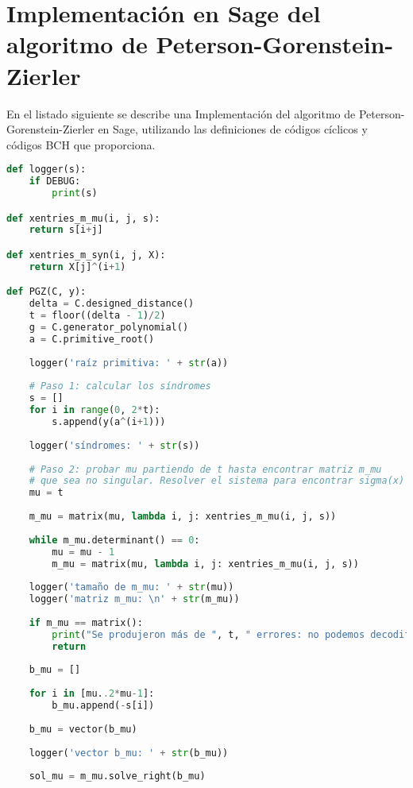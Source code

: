 \chapter[Implementación en Sage del algoritmo PGZ]{Implementación en Sage del algoritmo de Peterson-Gorenstein-Zierler}

En el listado siguiente se describe una Implementación del algoritmo de Peterson-Gorenstein-Zierler en Sage, utilizando las definiciones de códigos cíclicos y códigos BCH que proporciona.

\begin{lstlisting}[language=Python, caption=Implementación del algoritmo de Peterson-Gorenstein-Zierler en Sage]
  def logger(s):
    if DEBUG:
        print(s)

def xentries_m_mu(i, j, s):
    return s[i+j]

def xentries_m_syn(i, j, X):
    return X[j]^(i+1)

def PGZ(C, y):
    delta = C.designed_distance()
    t = floor((delta - 1)/2)
    g = C.generator_polynomial()
    a = C.primitive_root()
    
    logger('raíz primitiva: ' + str(a))
    
    # Paso 1: calcular los síndromes
    s = []
    for i in range(0, 2*t):
        s.append(y(a^(i+1)))
    
    logger('síndromes: ' + str(s))
        
    # Paso 2: probar mu partiendo de t hasta encontrar matriz m_mu
    # que sea no singular. Resolver el sistema para encontrar sigma(x)
    mu = t
    
    m_mu = matrix(mu, lambda i, j: xentries_m_mu(i, j, s))
    
    while m_mu.determinant() == 0:
        mu = mu - 1
        m_mu = matrix(mu, lambda i, j: xentries_m_mu(i, j, s))
    
    logger('tamaño de m_mu: ' + str(mu))
    logger('matriz m_mu: \n' + str(m_mu))
    
    if m_mu == matrix():
        print("Se produjeron más de ", t, " errores: no podemos decodificar")
        return
    
    b_mu = []
    
    for i in [mu..2*mu-1]:
        b_mu.append(-s[i])
        
    b_mu = vector(b_mu)
    
    logger('vector b_mu: ' + str(b_mu))
    
    sol_mu = m_mu.solve_right(b_mu)
    

\end{lstlisting}
